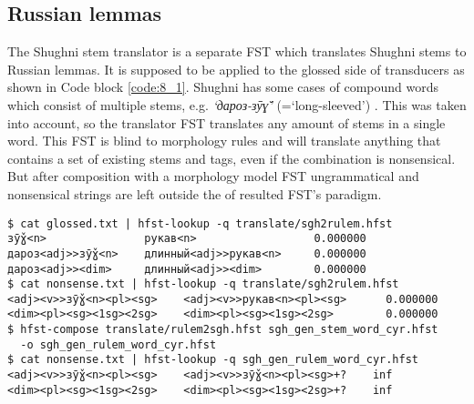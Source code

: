 \subsection{Russian lemmas } \label{rulemm_section}
The Shughni stem translator is a separate FST which translates Shughni stems to Russian lemmas. It is supposed to be applied to the glossed side of transducers as shown in Code block \ref{code:8_1}. Shughni has some cases of compound words which consist of multiple stems, e.g. \textit{`дароз-зӯɣ̌'} (=`long-sleeved') \parencite[173]{parker_shughni_2023}. This was taken into account, so the translator FST translates any amount of stems in a single word. This FST is blind to morphology rules and will translate anything that contains a set of existing stems and tags, even if the combination is nonsensical. But after composition with a morphology model FST ungrammatical and nonsensical strings are left outside the of resulted FST's paradigm.

\begin{code_frame}[float,floatplacement=h!]
    \begin{footnotesize}\codespacing
    \begin{verbatim}
$ cat glossed.txt | hfst-lookup -q translate/sgh2rulem.hfst 
зӯɣ̌<n>               рукав<n>                  0.000000
дароз<adj>>зӯɣ̌<n>    длинный<adj>>рукав<n>     0.000000
дароз<adj>><dim>     длинный<adj>><dim>        0.000000
$ cat nonsense.txt | hfst-lookup -q translate/sgh2rulem.hfst 
<adj><v>>зӯɣ̌<n><pl><sg>    <adj><v>>рукав<n><pl><sg>      0.000000
<dim><pl><sg><1sg><2sg>    <dim><pl><sg><1sg><2sg>        0.000000
$ hfst-compose translate/rulem2sgh.hfst sgh_gen_stem_word_cyr.hfst
  -o sgh_gen_rulem_word_cyr.hfst
$ cat nonsense.txt | hfst-lookup -q sgh_gen_rulem_word_cyr.hfst
<adj><v>>зӯɣ̌<n><pl><sg>    <adj><v>>зӯɣ̌<n><pl><sg>+?    inf
<dim><pl><sg><1sg><2sg>    <dim><pl><sg><1sg><2sg>+?    inf
    \end{verbatim}
    \end{footnotesize}
    \tcblower
    \label{code:8_1}
\end{code_frame}

